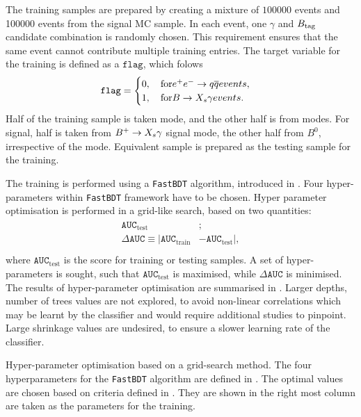 The training samples are prepared by creating a mixture of $100000$ \epem\ra\qqbar events and 100000 \BtoXsgamma events from the signal MC sample.
In each event, one $\gamma$ and $B_{\mathrm{tag}}$ candidate combination is randomly chosen.
This requirement ensures that the same event cannot contribute multiple training entries.
The target variable for the training is defined as a $\mathtt{flag}$, which folows
\begin{equation}
    \mathtt{flag}=\begin{cases}
      0,\quad \mathrm{for} \epem\ra\qqbar events,\\ 
      1,\quad \mathrm{for} \BtoXsgamma events.
      \end{cases}
\end{equation}
Half of the \epem\ra\qqbar training sample is taken \feiBp mode, and the other half is from \feiBz modes. 
For signal, half is taken from $\BptoXsgamma$ signal mode, the other half from $B^0$, irrespective of the \FEI mode.
Equivalent sample is prepared as the testing sample for the training.

The training is performed using a \texttt{FastBDT} algorithm, introduced in .
Four hyper-parameters within \texttt{FastBDT} framework have to be chosen.
Hyper parameter optimisation is performed in a grid-like search, based on two quantities:
\begin{align}\label{eq:optimisation_criteria}
    \begin{split}
    \mathtt{AUC}_{\mathrm{test}}&;\\
    \Delta \mathtt{AUC} \equiv |\mathtt{AUC}_{\mathrm{train}}& - \mathtt{AUC}_{\mathrm{test}}|,\\
    \end{split}
\end{align}
where $\mathtt{AUC}_{\mathrm{test}}$ is the \AUC score for training or testing samples.
A set of hyper-parameters is sought, such that $ \mathtt{AUC}_{\mathrm{test}}$ is maximised, while $\Delta \mathtt{AUC}$ is minimised.
The results of hyper-parameter optimisation are summarised in .
Larger depths, number of trees values are not explored, to avoid non-linear correlations which may be learnt by the classifier and would require additional studies to pinpoint.
Large shrinkage values are undesired, to ensure a slower learning rate of the classifier.

\begin{table}[htbp!]
    \centering
    \caption{\label{tab:grid_search}Hyper-parameter optimisation based on a grid-search method.
    The four hyperparameters for the \texttt{FastBDT} algorithm are defined in .
    The optimal values are chosen based on criteria defined in .
    They are shown in the right most column are taken as the parameters for the training.
    }
    
\end{table}

